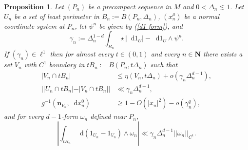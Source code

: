 \documentclass[reqno,12pt,letterpaper]{amsart}
\newcommand{\NN}{\mathbf{N}}
\newcommand*\dif{\mathop{}\!\mathrm{d}}
\newcommand{\normal}{\mathbf n}
\newtheorem{proposition}[theorem]{Proposition}
\theoremstyle{definition}
\numberwithin{equation}{section}
\begin{document}
\begin{proposition}\label{mollifier quant}
Let $(P_n)$ be a precompact sequence in $M$ and $0 < \Delta_n \lesssim 1$.
Let $U_n$ be a set of least perimeter in $B_n := B(P_n, \Delta_n)$, $(x^\mu_n)$ be a normal coordinate system at $P_n$, let $\psi^n$ be given by (\ref{d1 form}), and 
$$\gamma_n := \Delta_n^{1 - d} \int_{B_n} \star |\dif 1_U| - \dif 1_U \wedge \psi^n.$$
If $(\gamma_n) \in \ell^1$ then for almost every $t \in (0, 1)$ and every $n \in \NN$ there exists a set $V_n$ with $C^1$ boundary in $tB_n := B(P_n, t\Delta_n)$ such that
\begin{align}
|V_n \cap tB_n| &\leq \eta(V_n, t\Delta_n) + o(\gamma_n \Delta_n^{d - 1}), \label{mollifier quant1}\\
||U_n \cap tB_n| - |V_n \cap tB_n|| &\ll \gamma_n \Delta_n^{d - 1}, \label{mollifier quant2}\\
g^{-1}(\normal_{V_n}, \dif x^0_n) &\geq 1 - O(|x_n|^2) - o(\gamma_n^q), \label{mollifier quant4}
\end{align}
and for every $d-1$-form $\omega_n$ defined near $P_n$,
\begin{equation}\label{mollifier quant3}
\left|\int_{tB_n} \dif(1_{U_n} - 1_{V_n}) \wedge \omega_n\right| \ll \gamma_n \Delta_n^{d - 1} ||\omega_n||_{C^1}.
\end{equation}
\end{proposition}
\end{document}

